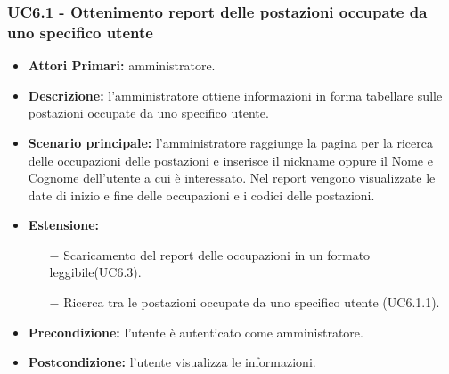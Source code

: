 \subsubsection{ UC6.1 - Ottenimento report delle postazioni occupate da uno specifico utente}
\begin{itemize}
           	\item\textbf{Attori Primari:} 
           	amministratore.
           	\item\textbf{Descrizione:} 
           	l'amministratore ottiene informazioni in forma tabellare sulle postazioni occupate da uno specifico utente.
           	\item\textbf{Scenario principale:} 
           	l'amministratore raggiunge la pagina per la ricerca delle occupazioni delle postazioni e inserisce il nickname oppure il Nome e Cognome dell'utente a cui è interessato.
           	Nel report vengono visualizzate le date di inizio e fine delle occupazioni e i codici delle postazioni.
           	\item\textbf{Estensione:}
           	\begin{itemize}
           		\item[$-$] Scaricamento del report delle occupazioni in un formato leggibile(UC6.3).
           		\item[$-$] Ricerca tra le postazioni occupate da uno specifico utente (UC6.1.1).
           	\end{itemize}
           	\item\textbf{Precondizione:} 
           	l'utente è autenticato come amministratore.
           	\item\textbf{Postcondizione:}
           	l'utente visualizza le informazioni.
\end{itemize}

